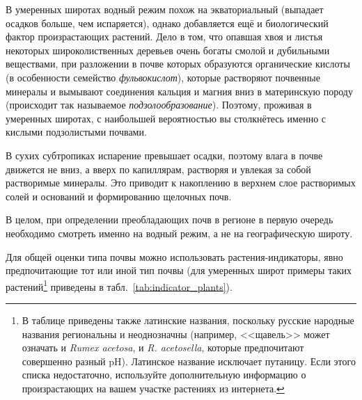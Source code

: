 В умеренных широтах водный режим похож на экваториальный (выпадает осадков больше, чем испаряется), однако добавляется ещё и биологический фактор произрастающих растений. Дело в том, что опавшая хвоя и листья некоторых широколиственных деревьев очень богаты смолой и дубильными веществами, при разложении в почве которых образуются органические кислоты (в особенности семейство \emph{фульвокислот}), которые растворяют почвенные минералы и вымывают соединения кальция и магния вниз в материнскую породу (происходит так называемое \emph{подзолообразование}). Поэтому, проживая в умеренных широтах, с наибольшей вероятностью вы столкнётесь именно с кислыми подзолистыми почвами.

В сухих субтропиках испарение превышает осадки, поэтому влага в почве движется не вниз, а вверх по капиллярам, растворяя и увлекая за собой растворимые минералы. Это приводит к накоплению в верхнем слое растворимых солей и оснований и формированию щелочных почв.

В целом, при определении преобладающих почв в регионе в первую очередь необходимо смотреть именно на водный режим, а не на географическую широту.

Для общей оценки типа почвы можно использовать растения-индикаторы, явно предпочитающие тот или иной тип почвы (для умеренных широт примеры таких растений\footnote{В таблице приведены также латинские названия, поскольку русские народные названия региональны и неоднозначны (например, <<щавель>> может означать и \emph{Rumex acetosa}, и \emph{R. acetosella}, которые предпочитают совершенно разный pH). Латинское название исключает путаницу. Если этого списка недостаточно, используйте дополнительную информацию о произрастающих на вашем участке растениях из интернета.} приведены в табл.~\ref{tab:indicator_plants}).

